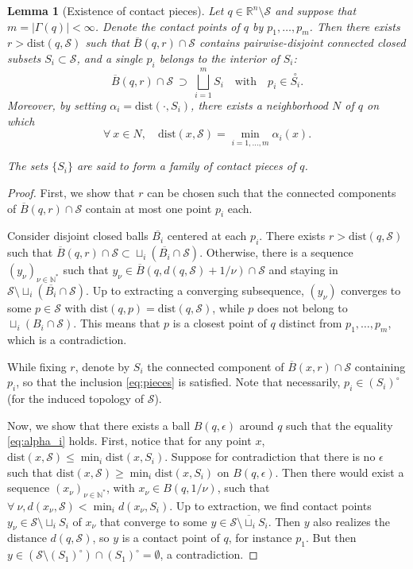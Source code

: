 \documentclass[11pt]{article}
\newcommand{\R}{\mathbb{R}}
\newcommand{\Nbb}{\mathbb{N}}
\newcommand{\eps}{\epsilon}
\newcommand{\inter}{\cap}
\newcommand{\dist}{\mathrm{dist}}
\newcommand{\Surf}{\mathcal{S}}
\theoremstyle{plain}
\newtheorem{lem}{Lemma}
\theoremstyle{definition}
\theoremstyle{remark}
\begin{document}
\begin{lem}[Existence of contact pieces] \label{lem:pieces}
Let $q \in \R^n \setminus \Surf$ and suppose that $m = |\Gamma(q)| < \infty$. Denote the contact points of $q$ by $p_1,\ldots,p_m$. 
Then there exists $r > \dist(q, \Surf)$ such that $\overline{B}(q,r) \inter \Surf$ contains pairwise-disjoint connected closed subsets $S_i \subset \Surf$,
and a single $p_i$ belongs to the interior of $S_i$:
\begin{equation} \label{eq:pieces}
\overline{B}(q,r) \inter \Surf ~ \supset ~ \bigsqcup\limits_{i=1}^m S_i \quad \text{with} \quad p_i \in \overset{\circ}{S_i}.
\end{equation}
Moreover, by setting $\alpha_i = \dist(\cdot, S_i)$, there exists a neighborhood $N$ of $q$ on which 
\begin{equation} \label{eq:alpha_i}
\forall\ x \in N, \quad \dist(x, \Surf) = \min \limits_{i = 1,\ldots,m} \alpha_i(x).
\end{equation}

The sets $\{S_i\}$ are said to form a family of \emph{contact pieces} of $q$.
\end{lem}
\begin{proof}
First, we show that $r$ can be chosen such that the connected components of $\overline{B}(q,r) \inter \Surf$ contain at most one point $p_i$ each.

Consider disjoint closed balls $\overline{B_i}$ centered at each $p_i$.
There exists $r > \dist(q, \Surf)$ such that $\overline{B}(q,r) \inter \Surf \subset \sqcup_i (\overline{B_i} \inter \Surf)$. Otherwise, there is a sequence $(y_\nu)_{\nu \in \Nbb^*}$ such that $y_\nu \in \overline{B}(q, d(q,\Surf) + 1/\nu ) \inter \Surf$ and  staying in $\Surf \setminus \sqcup _i(\overline{B_i} \inter \Surf)$. Up to extracting a converging subsequence, $(y_\nu)$ converges to some $p \in \Surf$ with $\dist(q,p) = \dist(q,\Surf)$, while $p$ does not belong to $\sqcup_i (B_i \inter \Surf)$. This means that $p$ is a closest point of $q$ distinct from $p_1,\ldots,p_m$, which is a contradiction.

While fixing $r$, denote by $S_i$ the connected component of $\overline{B}(x,r) \inter \Surf$ containing $p_i$, so that the inclusion \eqref{eq:pieces} is satisfied.
Note that necessarily, $p_i \in (S_i)^\circ $ (for the induced topology of $\Surf$).

Now, we show that there exists a ball $B(q,\eps)$ around $q$ such that the equality \eqref{eq:alpha_i} holds. First, notice that for any point $x$, $\dist(x, \Surf) \leq \min_i \dist(x, S_i)$. Suppose for contradiction that there is no $\eps$ such that $\dist(x, \Surf) \geq \min_i \dist(x, S_i)$ on $B(q,\eps)$. Then there would exist a sequence $(x_\nu)_{\nu \in \Nbb^*}$, with $x_\nu \in B(q,1/\nu)$, such that $\forall\ \nu, d(x_\nu,\Surf) < \min_i d(x_\nu, S_i)$. Up to extraction, we find contact points $y_\nu \in \Surf \setminus \sqcup_i S_i$ of $x_\nu$ that converge to some $y \in \overline{\Surf \setminus \sqcup_i S_i}$. Then $y$ also realizes the distance $d(q,\Surf)$, so $y$ is a contact point of $q$, for instance $p_1$. But then $y \in ( \Surf \setminus (S_1)^\circ ) \inter (S_1)^\circ = \emptyset$, a contradiction.
\end{proof}
\end{document}
